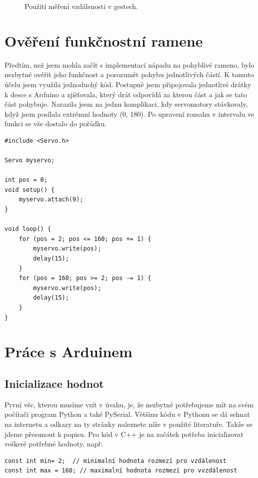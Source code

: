 \documentclass[12pt, a4paper,
twoside,        %
openright
]{report}
\begin{document}
{\begin{figure}[h]
	
	\caption{Použití měření vzdálenosti v gestech.} %
	\label{fig:vzdalenost} %
\end{figure}



\newpage

\section{Ověření funkčnostní ramene}
Předtím, než jsem mohla začít s implementací nápadu na pohyblivé rameno, bylo nezbytné ověřit jeho funkčnost a porozumět pohybu jednotlivých částí. K tomuto účelu jsem využila jednoduchý kód. Postupně jsem připojovala jednotlivé drátky k desce s Arduino a zjišťovala, který drát odpovídá za kterou část a jak se tato část pohybuje. Narazila jsem na jednu komplikaci, kdy servomotory stávkovaly, když jsem posílala extrémní hodnoty (0, 180). Po upravení rozsahu v intervalu ve funkci se vše dostalo do pořádku.
\begin{lstlisting}[style=Python, caption={Ukázka kódu k ověření funkčnosti}]
#include <Servo.h>

Servo myservo;  

int pos = 0;    
void setup() {
	myservo.attach(9);  
}

void loop() {
	for (pos = 2; pos <= 160; pos += 1) { 
		myservo.write(pos);             
		delay(15);                      
	}
	for (pos = 160; pos >= 2; pos -= 1) {
		myservo.write(pos);            
		delay(15);                       
	}
}
\end{lstlisting}

\newpage

\section{Práce s Arduinem}
\subsection{Inicializace hodnot}
První věc, kterou musíme vzít v úvahu, je, že nezbytně potřebujeme mít na svém počítači program Python a také PySerial. Většinu kódu v Pythonu se dá sehnat na internetu a odkazy na ty stránky naleznete níže v použité literatuře. 
Takže se jdeme přesunout k popisu.
Pro kód v C++ je na začátek potřeba inicializovat veškeré potřebné hodnoty.
např:

\begin{lstlisting}[style=Python, caption={Inicializace potřebných hodnot}]
const int min= 2;  // minimalní hodnota rozmezí pro vzdálenost
const int max = 160; // maximalní hodnota rozmezí pro vvzdálenost


\end{lstlisting}}
\end{document}
